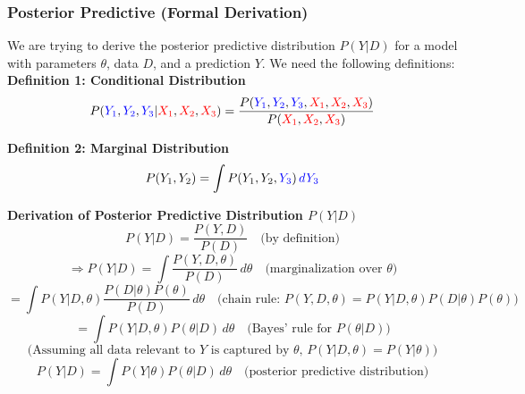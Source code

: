 \documentclass{beamer}
\begin{document}
\begin{frame}
\frametitle{Posterior Predictive (Formal Derivation)}
\begin{tiny}
We are trying to derive the posterior predictive distribution \(P(Y | D)\) for a model with parameters \(\theta\), data \(D\), and a prediction \(Y\). We need the following definitions: \\

\textbf{Definition 1: Conditional Distribution} \\

\[
P(\textcolor{blue}{Y_1}, \textcolor{blue}{Y_2}, \textcolor{blue}{Y_3} | \textcolor{red}{X_1}, \textcolor{red}{X_2}, \textcolor{red}{X_3}) = \frac{P(\textcolor{blue}{Y_1}, \textcolor{blue}{Y_2}, \textcolor{blue}{Y_3}, \textcolor{red}{X_1}, \textcolor{red}{X_2}, \textcolor{red}{X_3})}{P(\textcolor{red}{X_1}, \textcolor{red}{X_2}, \textcolor{red}{X_3})}
\]

\textbf{Definition 2: Marginal Distribution} \\

\[
P(Y_1, Y_2) = \int P(Y_1, Y_2, \textcolor{blue}{Y_3}) \, \textcolor{blue}{dY_3}
\]

\textbf{Derivation of Posterior Predictive Distribution \(P(Y | D)\)} \\
\[
P(Y | D) = \frac{P(Y, D)}{P(D)} \quad \text{(by definition)}
\]
\[
\Rightarrow P(Y | D) = \int \frac{P(Y, D, \theta)}{P(D)} \, d\theta \quad \text{(marginalization over } \theta\text{)}
\]
\[
= \int P(Y | D, \theta) \frac{P(D | \theta) P(\theta)}{P(D)} \, d\theta \quad \text{(chain rule: } P(Y, D, \theta) = P(Y | D, \theta) P(D | \theta) P(\theta)\text{)}
\]
\[
= \int P(Y | D, \theta) P(\theta | D) \, d\theta \quad \text{(Bayes' rule for } P(\theta|D)\text{)}
\]
\[
\text{(Assuming all data relevant to } Y \text{ is captured by } \theta\text{, } P(Y | D, \theta) = P(Y | \theta)\text{)}
\]
\[
P(Y | D) = \int P(Y | \theta) P(\theta | D) \, d\theta \quad \text{(posterior predictive distribution)}
\]

\end{tiny}
\end{frame}
\end{document}
